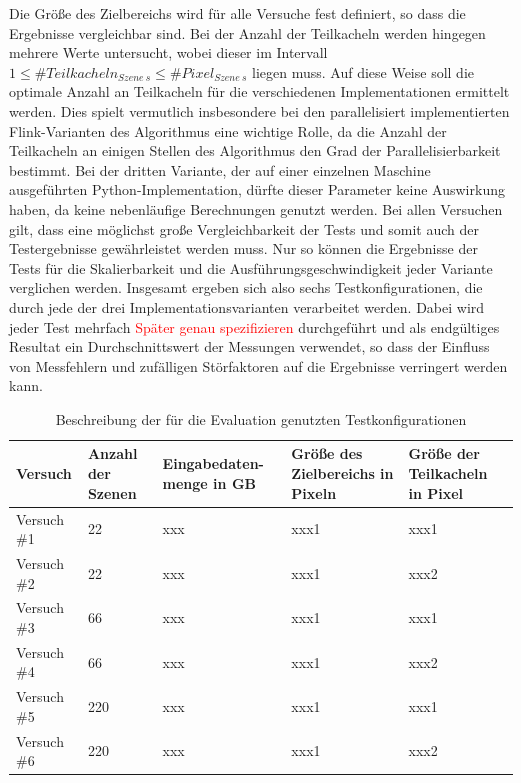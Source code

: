 Die Größe des Zielbereichs wird für alle Versuche fest definiert, so dass die Ergebnisse vergleichbar sind. Bei der Anzahl der Teilkacheln werden hingegen mehrere Werte untersucht, wobei dieser im Intervall \(1 \leq \mathbin{\#}Teilkacheln_{Szene\ s} \leq \mathbin{\#} Pixel_{Szene\ s} \) liegen muss. Auf diese Weise soll die optimale Anzahl an Teilkacheln für die verschiedenen Implementationen ermittelt werden. Dies spielt vermutlich insbesondere bei den parallelisiert implementierten Flink-Varianten des Algorithmus eine wichtige Rolle, da die Anzahl der Teilkacheln an einigen Stellen des Algorithmus den Grad der Parallelisierbarkeit bestimmt. Bei der dritten Variante, der auf einer einzelnen Maschine ausgeführten Python-Implementation, dürfte dieser Parameter keine Auswirkung haben, da keine nebenläufige Berechnungen genutzt werden. Bei allen Versuchen gilt, dass eine möglichst große Vergleichbarkeit der Tests und somit auch der Testergebnisse gewährleistet werden muss. Nur so können die Ergebnisse der Tests für die Skalierbarkeit und die Ausführungsgeschwindigkeit jeder Variante verglichen werden. Insgesamt ergeben sich also sechs Testkonfigurationen, die durch jede der drei Implementationsvarianten verarbeitet werden. Dabei wird jeder Test mehrfach \textcolor{red}{Später genau spezifizieren} durchgeführt und als endgültiges Resultat ein Durchschnittswert der Messungen verwendet, so dass der Einfluss von Messfehlern und zufälligen Störfaktoren auf die Ergebnisse verringert werden kann. 

\begin{table}[position specifier]
          \centering
          \begin{tabular}{| p{3cm} | p{2cm} | p{2cm} | p{2cm} | p{2cm} |}
          	\hline
                  Versuch & Anzahl der Szenen & Eingabedaten- menge in GB & Größe des Zielbereichs in Pixeln & Größe der Teilkacheln in Pixel \\
                  \hline
                  Versuch \#1 & 22 & xxx & xxx1 & xxx1 \\
                  \hline
                  Versuch \#2 & 22 & xxx & xxx1 & xxx2 \\
                  \hline
                  Versuch \#3 & 66 & xxx & xxx1 & xxx1 \\
                  \hline
                  Versuch \#4 & 66 & xxx & xxx1 & xxx2 \\
                  \hline
                  Versuch \#5 & 220 & xxx & xxx1 & xxx1 \\
                  \hline
                  Versuch \#6 & 220 & xxx & xxx1 & xxx2 \\
                  \hline

          \end{tabular}
          \caption{Beschreibung der für die Evaluation genutzten Testkonfigurationen}
          \label{tab:descriptionTestSetting}
\end{table}

